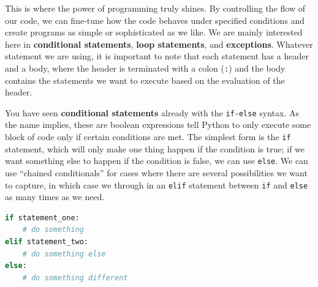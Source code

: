 \documentclass{tufte-book}
\begin{document}

This is where the power of programming truly shines. By controlling the flow of our code, we can fine-tune how the code behaves under specified conditions and create programs as simple or sophisticated as we like. We are mainly interested here in \textbf{conditional statements}, \textbf{loop statements}, and \textbf{exceptions}. Whatever statement we are using, it is important to note that each statement has a header and a body, where the header is terminated with a colon (\verb|:|) and the body contains the statements we want to execute based on the evaluation of the header.

You have seen \textbf{conditional statements} already with the \verb|if-else| syntax. As the name implies, these are boolean expressions tell Python to only execute some block of code only if certain conditions are met. The simplest form is the \verb|if| statement, which will only make one thing happen if the condition is true; if we want something else to happen if the condition is false, we can use \verb|else|. We can use ``chained conditionals'' for cases where there are several possibilities we want to capture, in which case we through in an \verb|elif| statement between \verb|if| and \verb|else| as many times as we need.

\begin{lstlisting}[language=Python, showstringspaces=false,
backgroundcolor=\color{lightgray}]
if statement_one:
    # do something
elif statement_two:
    # do something else
else:
    # do something different
\end{lstlisting}






\end{document}
